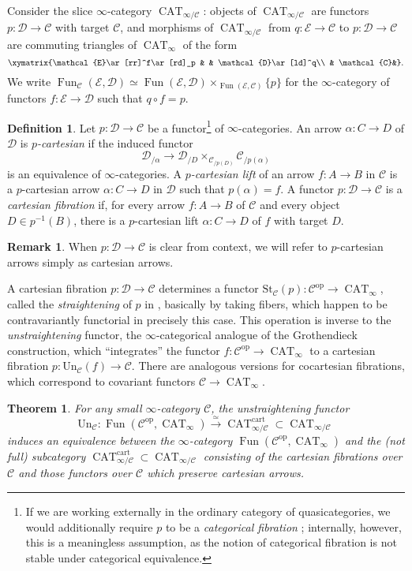 \documentclass[12pt]{article}
\newtheorem{theorem}{Theorem}[subsection]
\theoremstyle{definition}
\newtheorem{definition}{Definition}[subsection]
\newtheorem{remark}{Remark}[subsection]
\newcommand{\C}{\mathcal{C}}
\newcommand{\D}{\mathcal{D}}
\newcommand{\E}{\mathcal{E}}
\renewcommand{\i}{\infty}
\newcommand{\too}{\longrightarrow}
\newcommand{\op}{\mathrm{op}}
\DeclareMathOperator{\cart}{cart}
\DeclareMathOperator{\CAT}{CAT}
\DeclareMathOperator{\Fun}{Fun}
\begin{document}
Consider the slice $\i$-category $\CAT_{\i/\C}$: objects of $\CAT_{\i/\C}$ are functors $p:\D\to\C$ with target $\C$, and morphisms of $\CAT_{\i/\C}$ from $q:\E\to\C$ to $p:\D\to\C$ are commuting triangles of $\CAT_{\i}$ of the form
\[
\xymatrix{\E\ar[rr]^f\ar[rd]_p & & \D\ar[ld]^q\\
& \C &}.
\]
We write $\Fun_\C(\E,\D)\simeq\Fun(\E,\D)\times_{\Fun(\E,\C)}\{p\}$\index{$\Fun_\C$} for the $\i$-category of functors $f:\E\to\D$ such that $q\circ f = p$.

\begin{definition}
Let $p:\D\to\C$ be a functor\footnote{If we are working externally in the ordinary category of quasicategories, we would additionally require $p$ to be a {\em categorical fibration} \cite{HTT}; internally, however, this is a meaningless assumption, as the notion of categorical fibration is not stable under categorical equivalence.} of $\infty$-categories.
An arrow $\alpha:C\to D$ of $\D$ is {\em $p$-cartesian}
if the induced functor
\[
\D_{/\alpha}\too\D_{/D}\times_{\C_{/p(D)}} \C_{/p(\alpha)}
\]
is an equivalence of $\i$-categories.
A {\em $p$-cartesian lift} of an arrow $f:A\to B$ in $\C$ is a $p$-cartesian arrow $\alpha:C\to D$ in $\D$ such that $p(\alpha)=f$.
A functor $p:\D\to\C$ is a {\em cartesian fibration}
if, for every arrow $f:A\to B$ of $\C$ and every object $D\in p^{-1}(B)$, there is a $p$-cartesian lift $\alpha:C\to D$ of $f$ with target $D$.
\end{definition}

\begin{remark}
When $p:\D\to\C$ is clear from context, we will refer to $p$-cartesian arrows simply as cartesian arrows.
\end{remark} 
A cartesian fibration $p:\D\to\C$ determines a functor $\mathrm{St}_\C(p):\C^{\op}\to\CAT_\i$, called the {\em straightening} of $p$ in \cite{HTT}, basically by taking fibers, which happen to be contravariantly functorial in precisely this case.
This operation is inverse to the {\em unstraightening} functor, the $\i$-categorical analogue of the Grothendieck construction, which ``integrates'' the functor $f:\C^{\op}\to\CAT_\i$ to a cartesian fibration $p:\mathrm{Un}_\C(f)\to\C$.
There are analogous versions for cocartesian fibrations,
which correspond to covariant functors $\C\to\CAT_\i$.

\begin{theorem}{\em \cite[Theorem 3.2.0.1]{HTT}}
For any small $\infty$-category $\C$, the unstraightening functor
\[
\mathrm{Un}_\C\colon\Fun(\C^{\op},\CAT_\i)\overset{\simeq}{\too}\CAT_{\i/\C}^{\cart}\subset\CAT_{\i/\C}
\]
induces an equivalence between the $\infty$-category $\Fun(\C^{\op},\CAT_\i)$ and the (not full) subcategory $\CAT_{\i/\C}^{\cart}\subset\CAT_{\i/\C}$ consisting of the cartesian fibrations over $\C$ and those functors over $\C$ which preserve cartesian arrows.
\end{theorem}
\end{document}

